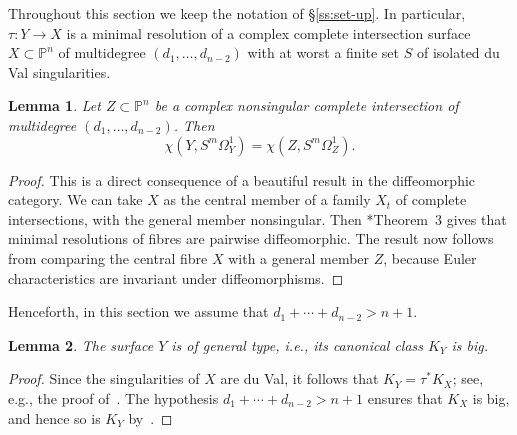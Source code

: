 \documentclass[12pt, reqno]{amsart}
\newtheorem{lemma}{Lemma}[section]
\theoremstyle{definition}
\newcommand{\PP}{{\mathbb P}}
\numberwithin{equation}{section}
\numberwithin{table}{section}
\begin{document}
Throughout this section we keep the notation of \S\ref{ss:set-up}. In particular, $\tau\colon Y \to X$ is a minimal resolution of a complex complete intersection surface $X \subset \PP^n$ of multidegree $(d_1,\ldots,d_{n-2})$ with at worst a finite set $S$ of isolated du Val singularities.

\begin{lemma}\label{L:atiyah}
Let $Z \subset \PP^n$ be a complex nonsingular complete intersection of multidegree $(d_1,\ldots,d_{n-2})$. Then
\[\chi(Y,S^m\Omega^1_Y)=\chi(Z,S^m\Omega^1_Z).\]
\end{lemma}
\begin{proof}
	This is a direct consequence of a beautiful result \cite{Atiyah1958} in the diffeomorphic category. We can take $X$ as the central member of a family $X_t$ of complete intersections, with the general member nonsingular. Then \cite{Atiyah1958}*{Theorem~3} gives that minimal resolutions of fibres are pairwise diffeomorphic. The result now follows from comparing the central fibre $X$ with a general member $Z$, because Euler characteristics are invariant under diffeomorphisms.
\end{proof}

Henceforth, in this section we assume that $d_1+\cdots+d_{n-2}>n+1$.

\begin{lemma} \label{L:Y_general_type} The surface $Y$ is of general type, i.e., its canonical class $K_Y$ is big.
\end{lemma}

\begin{proof}
Since the singularities of $X$ are du Val, it follows that $K_Y = \tau^*K_X$; see, e.g., the proof of~\cite[Theorem~4.20]{KollarMori}. The hypothesis $d_1+\cdots+d_{n-2}>n+1$ ensures that $K_X$ is big, and hence so is $K_Y$ by~\cite[Lemma~2.2.43]{Lazarsfeld}.
\end{proof}
\end{document}
